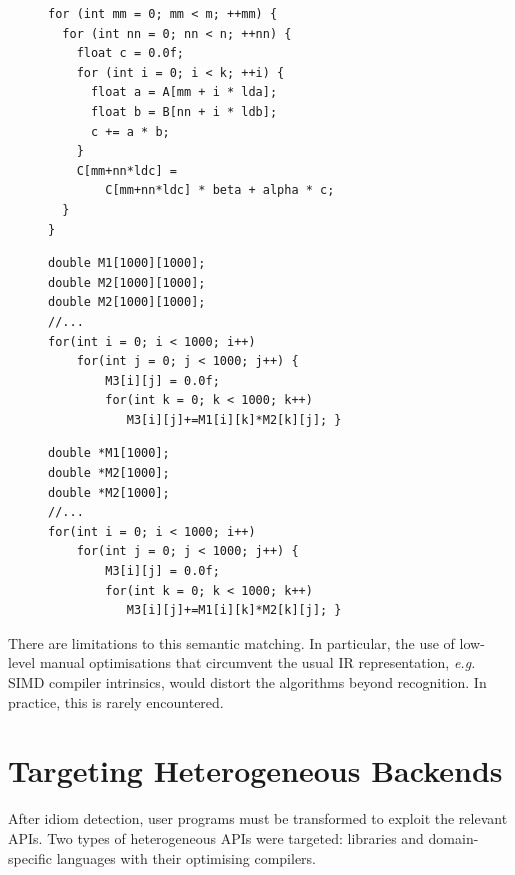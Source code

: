 \begin{figure}[p]
\begin{lstlisting}[language=MyCpp]
for (int mm = 0; mm < m; ++mm) {
  for (int nn = 0; nn < n; ++nn) {
    float c = 0.0f;
    for (int i = 0; i < k; ++i) {
      float a = A[mm + i * lda]; 
      float b = B[nn + i * ldb];
      c += a * b;
    }
    C[mm+nn*ldc] =
        C[mm+nn*ldc] * beta + alpha * c;
  }
}
\end{lstlisting}
\begin{lstlisting}[language=MyCpp,label={fig:gemmexamples},caption=
   {Two matching instances of GEMM:
    Although both loop nests are implemented very differently, they both match
    the same IDL specification and can be accelerated identically.}]
double M1[1000][1000];
double M2[1000][1000];
double M2[1000][1000];
//...
for(int i = 0; i < 1000; i++)
    for(int j = 0; j < 1000; j++) {
        M3[i][j] = 0.0f;
        for(int k = 0; k < 1000; k++)
           M3[i][j]+=M1[i][k]*M2[k][j]; }
\end{lstlisting}
\begin{lstlisting}[language=MyCpp,label={fig:gemmcounterexamples},caption=
   {This C program that does not match {\tt GEMM}.
    Although the loop syntax is identical to the matching example from
    \Cref{fig:gemmexamples}, the different types of the matrices prevent
    detection.
    This is desirable:
    Established backends are incompatible with such non-contiguous memory
    layout.}]
double *M1[1000];
double *M2[1000];
double *M2[1000];
//...
for(int i = 0; i < 1000; i++)
    for(int j = 0; j < 1000; j++) {
        M3[i][j] = 0.0f;
        for(int k = 0; k < 1000; k++)
           M3[i][j]+=M1[i][k]*M2[k][j]; }
\end{lstlisting}
\end{figure}

    There are limitations to this semantic matching.
    In particular, the use of low-level manual optimisations that circumvent the
    usual IR representation, {\em e.g.} SIMD compiler intrinsics, would
    distort the algorithms beyond recognition.
    In practice, this is rarely encountered.

\section{Targeting Heterogeneous Backends}

    After idiom detection, user programs must be transformed to exploit the
    relevant APIs.
    Two types of heterogeneous APIs were targeted:
    libraries and domain-specific languages with their optimising compilers.

